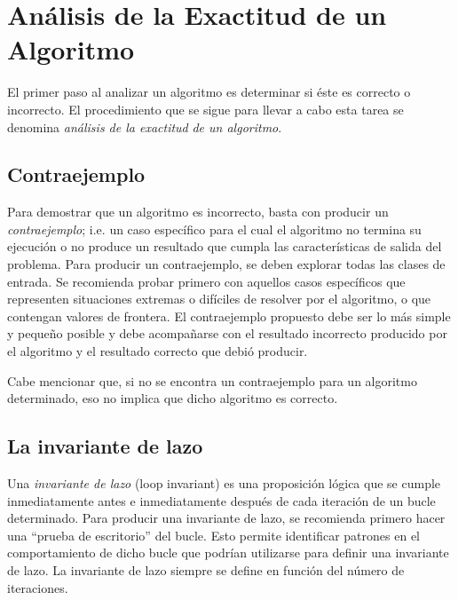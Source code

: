 
\chapter{Análisis de la Exactitud de un Algoritmo}

El primer paso al analizar un algoritmo es determinar si éste es correcto
o incorrecto. El procedimiento que se sigue para llevar a cabo esta
tarea se denomina \emph{análisis de la exactitud} \emph{de un algoritmo}.

\section{Contraejemplo}

Para demostrar que un algoritmo es incorrecto, basta con producir
un \emph{contraejemplo}; i.e. un caso específico para el cual el algoritmo
no termina su ejecución o no produce un resultado que cumpla las características
de salida del problema. Para producir un contraejemplo, se deben explorar
todas las clases de entrada. Se recomienda probar primero con aquellos
casos específicos que representen situaciones extremas o difíciles
de resolver por el algoritmo, o que contengan valores de frontera.
El contraejemplo propuesto debe ser lo más simple y pequeño posible
y debe acompañarse con el resultado incorrecto producido por el algoritmo
y el resultado correcto que debió producir. 

Cabe mencionar que, si no se encontra un contraejemplo para un algoritmo
determinado, eso no implica que dicho algoritmo es correcto.

\section{La invariante de lazo}

Una \emph{invariante de lazo} (loop invariant) es una proposición
lógica que se cumple inmediatamente antes e inmediatamente después
de cada iteración de un bucle determinado. Para producir una invariante
de lazo, se recomienda primero hacer una ``prueba de escritorio''
del bucle. Esto permite identificar patrones en el comportamiento
de dicho bucle que podrían utilizarse para definir una invariante
de lazo. La invariante de lazo siempre se define en función del número
de iteraciones. 

